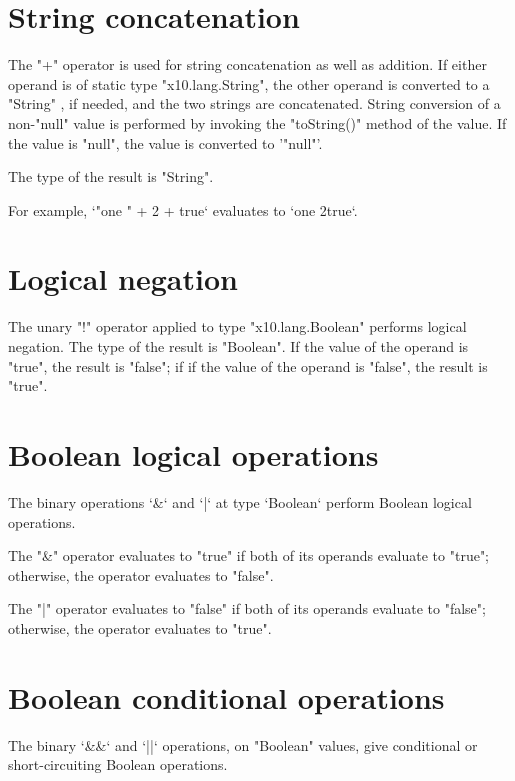 \section{String concatenation}

The \xcd"+"  operator is used for string concatenation 
 as well as addition.
If either operand is of static type \xcd"x10.lang.String",
 the other operand is converted to a \xcd"String" , if needed,
  and  the two strings  are concatenated.
 String conversion of a non-\xcd"null" value is  performed by invoking the
 \xcd"toString()" method of the value.
  If the value is \xcd"null", the value is converted to 
  \xcd'"null"'.

The type of the result is \xcd"String".

 For example, 
      \xcd`"one " + 2 + true` 
      evaluates to  \xcd`one 2true`.  

\section{Logical negation}

The  unary \xcd"!" operator 
applied to type \xcd"x10.lang.Boolean" 
performs logical negation.
The type of the result is \xcd"Boolean".
If the value of the operand is \xcd"true", the result is \xcd"false"; if
if the value of the operand  is \xcd"false", the result is \xcd"true".


\section{Boolean logical operations}

The binary  operations \xcd`&` and \xcd`|` 
at type \xcd`Boolean`
perform Boolean logical operations.

The \xcd"&" operator  evaluates to \xcd"true" if both of its
operands evaluate to \xcd"true"; otherwise, the operator
evaluates to \xcd"false".

The \xcd"|" operator  evaluates to \xcd"false" if both of its
operands evaluate to \xcd"false"; otherwise, the operator
evaluates to \xcd"true".

\section{Boolean conditional operations}

The binary \xcd`&&` and \xcd`||` operations, on 
\xcd"Boolean" values, give conditional or short-circuiting Boolean operations.  

